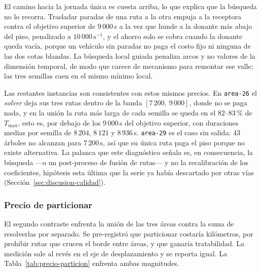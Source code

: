 El camino hacia la jornada única es cuesta arriba, lo que explica que la
búsqueda no lo recorra. Trasladar paradas de una ruta a la otra empuja a la
receptora contra el objetivo superior de $9\,000$\,s a la vez que hunde a la
donante más abajo del piso, penalizado a $10\,000\,\text{s}^{-1}$, y el ahorro
solo se cobra cuando la donante queda vacía, porque un vehículo sin paradas no
paga el costo fijo ni ninguna de las dos cotas blandas. La búsqueda local guiada
penaliza arcos y no valores de la dimensión temporal, de modo que carece de
mecanismo para remontar ese valle; las tres semillas caen en el mismo mínimo
local.

Las restantes instancias son consistentes con estos mismos precios. En
\texttt{area-26} el \textit{solver} deja sus tres rutas dentro de la banda
$[7\,200,\ 9\,000]$, donde no se paga nada, y en la unión la ruta más larga de
cada semilla se queda en el $82$--$83$\,\% de $T_{\max}$, esto es, por debajo de
los $9\,000$\,s del objetivo superior, con duraciones medias por semilla de
$8\,204$, $8\,121$ y $8\,936$\,s.
\texttt{area-29} es el caso sin salida: 43 árboles no alcanzan para $7\,200$\,s,
así que su única ruta paga el piso porque no existe alternativa. La palanca que
este diagnóstico señala es, en consecuencia, la búsqueda ---o un post-proceso de
fusión de rutas--- y no la recalibración de los coeficientes, hipótesis esta
última que la serie ya había descartado por otras vías
(Sección~\ref{sec:discusion-calidad}).

\subsubsection*{Precio de particionar}

El segundo contraste enfrenta la unión de las tres áreas contra la suma de
resolverlas por separado. Se pre-registró que particionar costaría kilómetros,
por prohibir rutas que crucen el borde entre áreas, y que ganaría tratabilidad.
La medición sale al revés en el eje de desplazamiento y se reporta igual.
La Tabla~\ref{tab:precio-particion} enfrenta ambas magnitudes.

